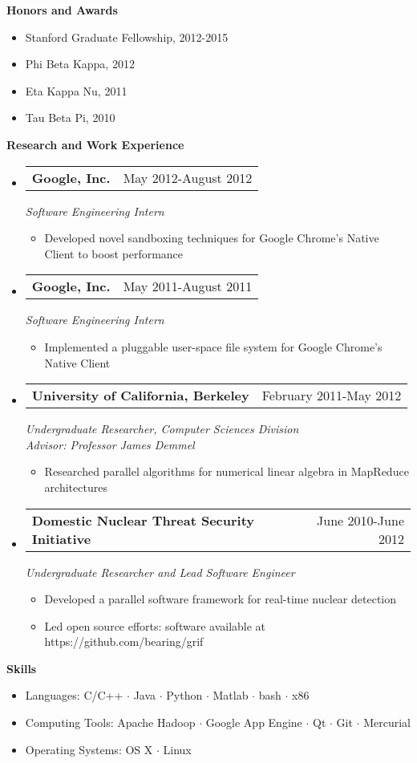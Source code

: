 \documentclass[letterpaper,11pt]{article}
\makeatletter
\newcommand{\resitem}[1]{\item #1 \vspace{-2pt}}
\newcommand{\desitem}[1]{\item #1 \vspace{-7pt}}
\newcommand{\resheading}[1]{{\large \colorbox{mygrey}{\begin{minipage}{\textwidth}{\textbf{#1 \vphantom{p\^{E}}}}\end{minipage}}}}
\newcommand{\expsubheading}[3]{
\begin{tabular*}{7.0in}{l@{\extracolsep{\fill}}r}
		\textbf{#1} & #2 \\
\end{tabular*}
\emph{#3}
\vspace{-6pt}
}
\makeatother
\begin{document}
\resheading{Honors and Awards}
\begin{itemize}
	\desitem{Stanford Graduate Fellowship, 2012-2015}
	\desitem{Phi Beta Kappa, 2012}
	\desitem{Eta Kappa Nu, 2011}
	\desitem{Tau Beta Pi, 2010}
\end{itemize}

\vspace{0.1in}

\resheading{Research and Work Experience}
\begin{itemize}
\item
     \expsubheading{Google, Inc.}{May 2012-August 2012}{Software Engineering Intern}
     \begin{itemize}
         \resitem{Developed novel sandboxing techniques for Google Chrome's Native Client to boost performance}
     \end{itemize}
     
     \item
     \expsubheading{Google, Inc.}{May 2011-August 2011}{Software Engineering Intern}
     \begin{itemize}
         \resitem{Implemented a pluggable user-space file system for Google Chrome's Native Client}
     \end{itemize}

\item
   \expsubheading{University of California, Berkeley}{February 2011-May 2012}{Undergraduate Researcher, Computer Sciences Division \\
   Advisor: Professor James Demmel}
    \begin{itemize}
             \resitem{Researched parallel algorithms for numerical linear algebra in MapReduce architectures}
     \end{itemize}
     
\item
    \expsubheading{Domestic Nuclear Threat Security Initiative}{June 2010-June 2012}{Undergraduate Researcher and Lead Software Engineer}
    \begin{itemize}
         \resitem{Developed a parallel software framework for real-time nuclear detection}
         \resitem{Led open source efforts: software available at https://github.com/bearing/grif}
     \end{itemize}    
     
\end{itemize}

\vspace{0.1in}

\resheading{Skills}
\begin{itemize}
    \desitem{Languages:
                    C/C++ $\cdot$ Java $\cdot$ Python $\cdot$ Matlab $\cdot$ bash $\cdot$ x86}
    \desitem{Computing Tools:
                     Apache Hadoop $\cdot$ Google App Engine $\cdot$ Qt $\cdot$ Git $\cdot$ Mercurial}
    \desitem{Operating Systems:
                     OS X $\cdot$ Linux}
\end{itemize}
\end{document}
